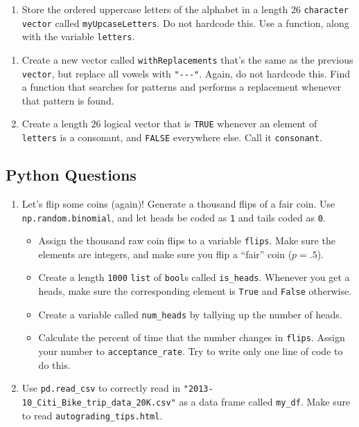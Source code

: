 \documentclass[
  12pt,
]{krantz}
\providecommand{\tightlist}{%
  \setlength{\itemsep}{0pt}\setlength{\parskip}{0pt}}
\begin{document}
\begin{enumerate}
\def\labelenumi{\arabic{enumi}.}
\setcounter{enumi}{3}
\tightlist
\item
  Store the ordered uppercase letters of the alphabet in a length \(26\) \texttt{character} \texttt{vector} called \texttt{myUpcaseLetters}. Do not hardcode this. Use a function, along with the variable \texttt{letters}.
\end{enumerate}

\begin{enumerate}
\def\labelenumi{\alph{enumi}.}
\item
  Create a new vector called \texttt{withReplacements} that's the same as the previous \texttt{vector}, but replace all vowels with \texttt{"-\/-\/-"}. Again, do not hardcode this. Find a function that searches for patterns and performs a replacement whenever that pattern is found.
\item
  Create a length \(26\) logical vector that is \texttt{TRUE} whenever an element of \texttt{letters} is a consonant, and \texttt{FALSE} everywhere else. Call it \texttt{consonant}.
\end{enumerate}

\hypertarget{python-questions-1}{%
\subsection{Python Questions}\label{python-questions-1}}

\begin{enumerate}
\def\labelenumi{\arabic{enumi}.}
\item
  Let's flip some coins (again)! Generate a thousand flips of a fair coin. Use \texttt{np.random.binomial}, and let heads be coded as \texttt{1} and tails coded as \texttt{0}.

  \begin{itemize}
  \tightlist
  \item
    Assign the thousand raw coin flips to a variable \texttt{flips}. Make sure the elements are integers, and make sure you flip a ``fair'' coin (\(p=.5\)).
  \item
    Create a length \texttt{1000} \texttt{list} of \texttt{bool}s called \texttt{is\_heads}. Whenever you get a heads, make sure the corresponding element is \texttt{True} and \texttt{False} otherwise.
  \item
    Create a variable called \texttt{num\_heads} by tallying up the number of heads.
  \item
    Calculate the percent of time that the number changes in \texttt{flips}. Assign your number to \texttt{acceptance\_rate}. Try to write only one line of code to do this.
  \end{itemize}
\item
  Use \texttt{pd.read\_csv} to correctly read in \texttt{"2013-10\_Citi\_Bike\_trip\_data\_20K.csv"} as a data frame called \texttt{my\_df}. Make sure to read \texttt{autograding\_tips.html}.
\end{enumerate}
\end{document}
